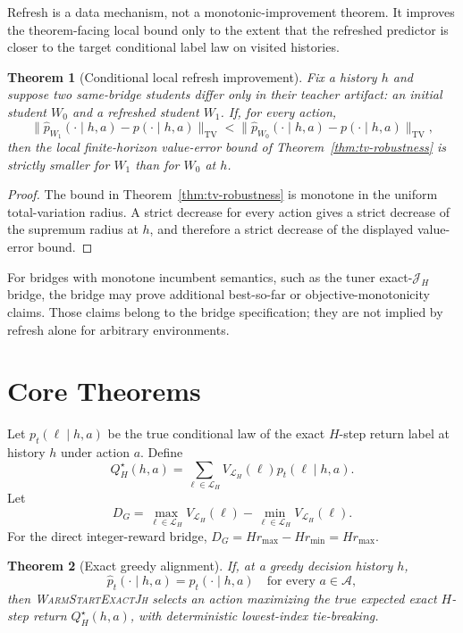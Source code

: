 \documentclass[11pt]{article}
\newtheorem{theorem}{Theorem}
\newcommand{\Warm}{\textnormal{\textsc{WarmStartExactJh}}}
\newcommand{\Act}{\mathcal{A}}
\newcommand{\TV}{\mathrm{TV}}
\newcommand{\Jh}{\mathcal{J}_H}
\newcommand{\Lab}{\mathcal{L}_H}
\newcommand{\Vlab}{V_{\Lab}}
\begin{document}
Refresh is a data mechanism, not a monotonic-improvement theorem. It improves
the theorem-facing local bound only to the extent that the refreshed predictor
is closer to the target conditional label law on visited histories.

\begin{theorem}[Conditional local refresh improvement]
Fix a history \(h\) and suppose two same-bridge students differ only in their
teacher artifact: an initial student \(W_0\) and a refreshed student \(W_1\).
If, for every action,
\[
\|\widehat p_{W_1}(\cdot\mid h,a)-p(\cdot\mid h,a)\|_{\TV}
<
\|\widehat p_{W_0}(\cdot\mid h,a)-p(\cdot\mid h,a)\|_{\TV},
\]
then the local finite-horizon value-error bound of
Theorem~\ref{thm:tv-robustness} is strictly smaller for \(W_1\) than for
\(W_0\) at \(h\).
\end{theorem}

\begin{proof}
The bound in Theorem~\ref{thm:tv-robustness} is monotone in the uniform
total-variation radius. A strict decrease for every action gives a strict
decrease of the supremum radius at \(h\), and therefore a strict decrease of
the displayed value-error bound.
\end{proof}

For bridges with monotone incumbent semantics, such as the tuner exact-\(\Jh\)
bridge, the bridge may prove additional best-so-far or objective-monotonicity
claims. Those claims belong to the bridge specification; they are not implied
by refresh alone for arbitrary environments.

\section{Core Theorems}
\label{sec:theorems}

Let \(p_t(\ell\mid h,a)\) be the true conditional law of the exact
\(H\)-step return label at history \(h\) under action \(a\). Define
\[
Q^\star_H(h,a)=\sum_{\ell\in\Lab}\Vlab(\ell)p_t(\ell\mid h,a).
\]
Let
\[
D_G=\max_{\ell\in\Lab}\Vlab(\ell)-\min_{\ell\in\Lab}\Vlab(\ell).
\]
For the direct integer-reward bridge, \(D_G=Hr_{\max}-Hr_{\min}=Hr_{\max}\).

\begin{theorem}[Exact greedy alignment]
If, at a greedy decision history \(h\),
\[
\widehat p_t(\cdot\mid h,a)=p_t(\cdot\mid h,a)
\quad\text{for every }a\in\Act,
\]
then \Warm{} selects an action maximizing the true expected exact
\(H\)-step return \(Q^\star_H(h,a)\), with deterministic lowest-index
tie-breaking.
\end{theorem}
\end{document}
